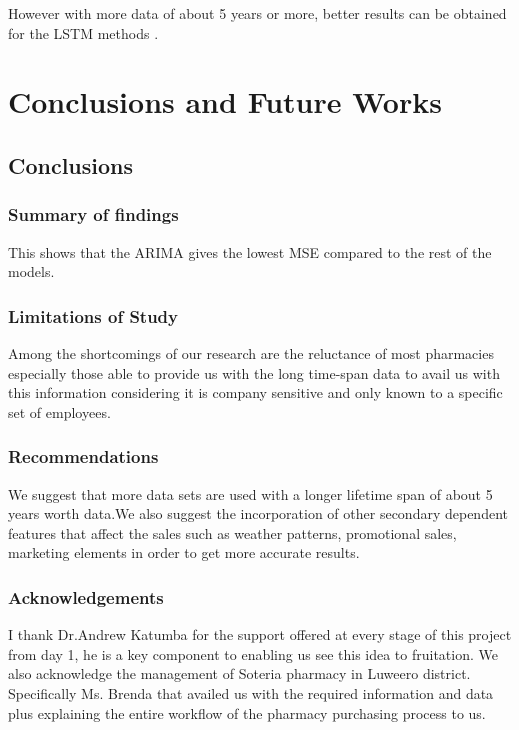 \documentclass[12pt]{report}
\begin{document}
However with more data of about 5 years or more, better results can be obtained for the LSTM methods .


\chapter{Conclusions and Future Works}

\section{Conclusions}

\subsection{Summary of findings}
This shows that the ARIMA gives the lowest MSE compared to the rest of the models.
\subsection{Limitations of Study}
Among the shortcomings of our research are the reluctance of most pharmacies especially those able to provide us with the long time-span data to avail us with this information considering it is company sensitive and only known to a specific set of employees.

\subsection{Recommendations}
We suggest that more data sets are used with a longer lifetime span of about 5 years worth data.We also suggest the incorporation of other secondary dependent features that affect the sales such as weather patterns, promotional sales, marketing elements in order to get more accurate results. 

\subsection{Acknowledgements}
I thank Dr.Andrew Katumba for the support offered at every stage of this project from day 1, he is a key component to enabling us see this idea to fruitation. We also acknowledge the management of Soteria pharmacy in Luweero district. Specifically Ms. Brenda that availed us with the required information and data plus explaining the entire workflow of the pharmacy purchasing process to us.\\
\end{document}
